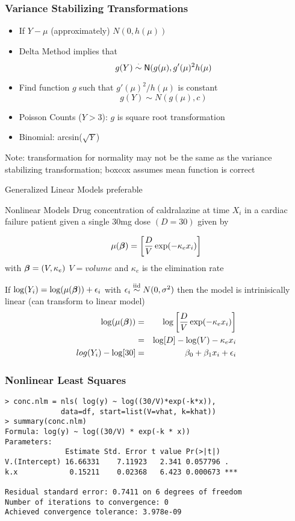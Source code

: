 \documentclass[]{beamer}
\begin{document}
  \begin{frame}\frametitle{Variance Stabilizing Transformations}
    \begin{itemize}
    \item If $Y - \mu$ (approximately) $N(0, h(\mu))$ \pause
    \item Delta Method implies that 
$$g(Y) \stackrel{\cdot}{\sim}\textsf{N}( g(\mu),  g'(\mu)^2 h(\mu)$$ \pause

\item Find function $g$ such that $g'(\mu)^2/h(\mu)$ is constant
$$g(Y) \sim N(g(\mu), c)$$\pause
    \end{itemize}
  
\begin{itemize}
\item Poisson Counts ($Y > 3$): $g$ is square root transformation \pause
\item Binomial: arcsin($ \sqrt{Y}$)
\end{itemize}
Note: transformation for normality may not be the same as the variance
stabilizing transformation; boxcox assumes mean function is correct \pause

\vspace{11pt}
Generalized Linear Models preferable

\end{frame}

\begin{frame}{Nonlinear Models}
Drug concentration of caldralazine  at time $X_i$ in a cardiac
failure patient given a single 30mg dose  $(D = 30)$ given by \pause

$$
\mu(\boldsymbol{\beta}) = \left[\frac{D}{V} \exp(-\kappa_e x_i) \right]
$$
with $\boldsymbol{\beta} = (V, \kappa_e)$  $V = volume$ and $\kappa_e$ is the
elimination rate \pause
  
If $\log(Y_i)  = \log(\mu(\boldsymbol{\beta})) + \epsilon_i$ with $\epsilon_i \mathrel{\mathop{\sim}\limits^{\rm iid}}
N(0, \sigma^2)$ then the model is intrinisically linear (can transform
to linear model)
\begin{eqnarray*}
\log(\mu(\boldsymbol{\beta})) & = & \log\left[\frac{D}{V} \exp(-\kappa_e x_i) \right]  \\
  & = & \log[D] - \log(V) -\kappa_e x_i \\
log(Y_i) - \log[30] & = &\beta_0 + \beta_1 x_i + \epsilon_i
\end{eqnarray*}
\pause

\end{frame}

\begin{frame}[fragile]\frametitle{Nonlinear Least Squares}
\begin{verbatim}
> conc.nlm = nls( log(y) ~ log((30/V)*exp(-k*x)), 
             data=df, start=list(V=vhat, k=khat))
> summary(conc.nlm)
Formula: log(y) ~ log((30/V) * exp(-k * x))
Parameters:
              Estimate Std. Error t value Pr(>|t|)    
V.(Intercept) 16.66331    7.11923   2.341 0.057796 .  
k.x            0.15211    0.02368   6.423 0.000673 ***

Residual standard error: 0.7411 on 6 degrees of freedom
Number of iterations to convergence: 0 
Achieved convergence tolerance: 3.978e-09
\end{verbatim}
\end{frame}
\end{document}

